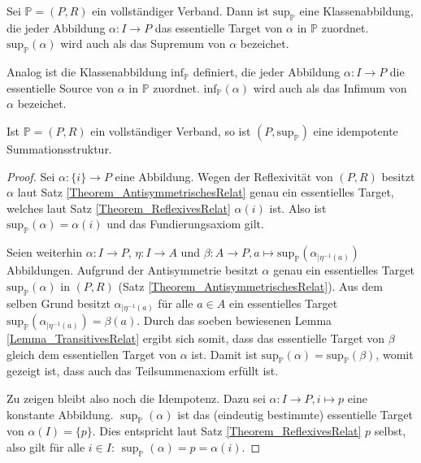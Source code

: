 \documentclass{article}
\begin{document}
\begin{definition}
  Sei $\mathbb{P} = (P, R)$ ein vollständiger Verband.
  Dann ist $\text{sup}_\mathbb{P}$ eine Klassenabbildung,
  die jeder Abbildung $\alpha \colon I \to P$
  das essentielle Target von $\alpha$ in $\mathbb{P}$ zuordnet.
  $\text{sup}_\mathbb{P}(\alpha)$ wird auch als das Supremum von $\alpha$ bezeichet.

  Analog ist die Klassenabbildung $\text{inf}_\mathbb{P}$ definiert,
  die jeder Abbildung $\alpha \colon I \to P$
  die essentielle Source von $\alpha$ in $\mathbb{P}$ zuordnet.
  $\text{inf}_\mathbb{P}(\alpha)$ wird auch als das Infimum von $\alpha$ bezeichet.
\end{definition}

\begin{theorem}\label{Theorem_VerbandSummationsstruktur}
  Ist $\mathbb{P} = (P, R)$ ein vollständiger Verband, 
  so ist $(P, \text{sup}_\mathbb{P})$
  eine idempotente Summationsstruktur.
\end{theorem}
\begin{proof}
  Sei $\alpha \colon \{i\} \to P$ eine Abbildung.
  Wegen der Reflexivität von $(P, R)$ besitzt $\alpha$ laut Satz \ref{Theorem_AntisymmetrischesRelat} genau ein essentielles Target,
  welches laut Satz \ref{Theorem_ReflexivesRelat} $\alpha(i)$ ist.
  Also ist $\text{sup}_\mathbb{P}(\alpha) = \alpha(i)$ und das Fundierungsaxiom gilt.

  Seien weiterhin $\alpha \colon I \to P$, $\eta \colon I \to A$
  und  $\beta \colon A \to P, a \mapsto \text{sup}_\mathbb{P}(\alpha_{\mid \eta^{-1}(a)})$ Abbildungen.
  Aufgrund der Antisymmetrie besitzt $\alpha$ genau ein essentielles Target $\text{sup}_\mathbb{P}(\alpha)$ in $(P, R)$ (Satz \ref{Theorem_AntisymmetrischesRelat}).
  Aus dem selben Grund besitzt $\alpha_{\mid \eta^{-1}(a)}$ für alle $a \in A$ ein essentielles Target $\text{sup}_\mathbb{P}(\alpha_{\mid \eta^{-1}(a)}) = \beta(a)$.
  Durch das soeben bewiesenen Lemma \ref{Lemma_TransitivesRelat} ergibt sich somit, 
  dass das essentielle Target von $\beta$ gleich dem essentiellen Target von $\alpha$ ist.
  Damit ist $\text{sup}_\mathbb{P}(\alpha) = \text{sup}_\mathbb{P}(\beta)$, womit gezeigt ist, dass auch das Teilsummenaxiom erfüllt ist.

  Zu zeigen bleibt also noch die Idempotenz.
  Dazu sei $\alpha \colon I \to P, i \mapsto p$ eine konstante Abbildung.
  $\sup_\mathbb{P}(\alpha)$ ist das (eindeutig bestimmte) essentielle Target von $\alpha(I) = \{p\}$.
  Dies entspricht laut Satz \ref{Theorem_ReflexivesRelat} $p$ selbst, also gilt für alle $i \in I$: $\sup_\mathbb{P}(\alpha) = p = \alpha(i)$.

\end{proof}
\end{document}
